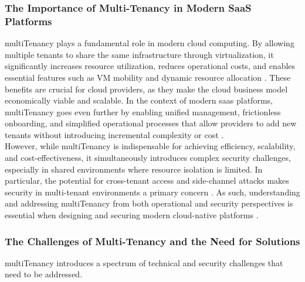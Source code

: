\documentclass[11pt, a4paper, oneside, listof=totoc]{scrartcl}
\begin{document}
            \subsubsection{The Importance of Multi-Tenancy in Modern SaaS Platforms}\label{subsubsec:mtImportance}
                \Gls{multiTenancy} plays a fundamental role in modern cloud computing.
                By allowing multiple tenants to share the same infrastructure through
                virtualization, it significantly increases resource utilization, reduces operational
                costs, and enables essential features such as VM mobility and dynamic resource
                allocation \parencite[pp.~345--346]{aljahdali2014}. 
                These benefits are crucial for cloud providers, as they make the cloud business
                model economically viable and scalable.
                In the context of modern \gls{saas} platforms, \gls{multiTenancy} goes even further
                by enabling unified management, frictionless onboarding, and simplified operational
                processes that allow providers to add new tenants without introducing incremental
                complexity or cost \parencite[pp.~9--11]{awsSaaSArchitectureFundamentals}.
                \\
                However, while \gls{multiTenancy} is indispensable for achieving efficiency,
                scalability, and cost-effectiveness, it simultaneously introduces complex security
                challenges, especially in shared environments where resource isolation is limited. 
                In particular, the potential for cross-tenant access and side-channel attacks makes
                security in multi-tenant environments a primary concern
                \parencite[pp.~345--346]{aljahdali2014}. 
                As such, understanding and addressing \gls{multiTenancy} from both operational and
                security perspectives is essential when designing and securing modern cloud-native
                platforms
                \parencites[pp.~9--11]{awsSaaSArchitectureFundamentals}[p.~4]{isoConcepts}.

            \subsubsection{The Challenges of Multi-Tenancy and the Need for Solutions}\label{subsubsec:challenges}
                \Gls{multiTenancy} introduces a spectrum of technical and security challenges that need
                to be addressed.
\end{document}
